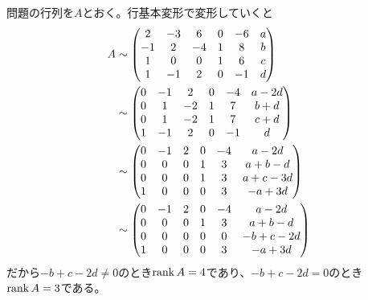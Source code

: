 \subsubsection{} %
\begin{sol}
  問題の行列を$A$とおく。行基本変形で変形していくと
  \begin{align*}
    A &\sim \begin{pmatrix}  2 &-3& 6& 0& -6& a \\ -1& 2& -4& 1& 8& b \\ 1& 0& 0& 1& 6& c \\ 1& -1& 2& 0& -1& d  \end{pmatrix} \\
    &\sim \begin{pmatrix}  0 &-1& 2& 0& -4& a-2d \\ 0& 1& -2& 1 &7& b+d \\ 0& 1& -2& 1& 7& c+d \\  1& -1& 2& 0& -1& d  \end{pmatrix}  \\
    &\sim \begin{pmatrix}  0 &-1& 2& 0& -4& a-2d \\  0& 0& 0& 1& 3& a+b-d \\ 0& 0& 0& 1& 3& a + c - 3d \\ 1& 0& 0& 0& 3& -a+3d \end{pmatrix} \\
    &\sim \begin{pmatrix}  0& -1& 2& 0& -4& a-2d \\ 0& 0& 0& 1& 3& a+b-d \\ 0& 0& 0& 0& 0& -b+c-2d \\  1& 0& 0& 0& 3& -a+3d \end{pmatrix}
  \end{align*}
  だから$-b+c-2d \neq 0$のとき$\operatorname{rank} A = 4$であり、$-b+c-2d = 0$のとき$\operatorname{rank} A = 3$である。
\end{sol}
